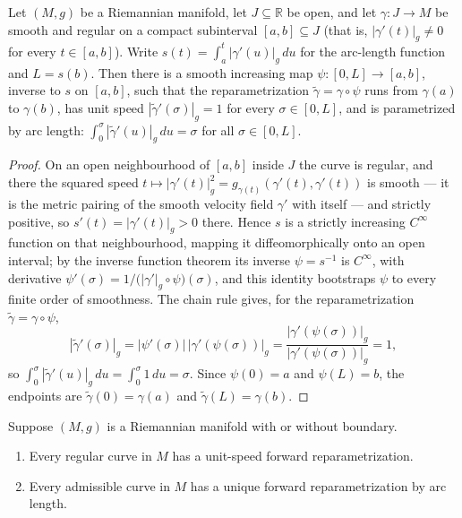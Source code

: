 \begin{proposition}
\label{prop:regular-curve-unit-speed-reparam}
\leanok
{}
Let $(M, g)$ be a Riemannian manifold, let $J \subseteq \mathbb{R}$ be open, and let $\gamma : J \to M$ be smooth and regular on a compact subinterval $[a,b] \subseteq J$ (that is, $|\gamma'(t)|_g \neq 0$ for every $t \in [a,b]$). Write $s(t) = \int_a^t |\gamma'(u)|_g \, du$ for the arc-length function and $L = s(b)$. Then there is a smooth increasing map $\psi : [0,L] \to [a,b]$, inverse to $s$ on $[a,b]$, such that the reparametrization $\tilde{\gamma} = \gamma \circ \psi$ runs from $\gamma(a)$ to $\gamma(b)$, has unit speed $|\tilde{\gamma}'(\sigma)|_g = 1$ for every $\sigma \in [0,L]$, and is parametrized by arc length: $\int_0^\sigma |\tilde{\gamma}'(u)|_g \, du = \sigma$ for all $\sigma \in [0,L]$.
\end{proposition}
\begin{proof}
\leanok
{}
On an open neighbourhood of $[a,b]$ inside $J$ the curve is regular, and there the squared speed $t \mapsto |\gamma'(t)|_g^2 = g_{\gamma(t)}(\gamma'(t), \gamma'(t))$ is smooth --- it is the metric pairing of the smooth velocity field $\gamma'$ with itself --- and strictly positive, so $s'(t) = |\gamma'(t)|_g > 0$ there. Hence $s$ is a strictly increasing $C^\infty$ function on that neighbourhood, mapping it diffeomorphically onto an open interval; by the inverse function theorem its inverse $\psi = s^{-1}$ is $C^\infty$, with derivative $\psi'(\sigma) = 1/\bigl(|\gamma'|_g \circ \psi\bigr)(\sigma)$, and this identity bootstraps $\psi$ to every finite order of smoothness. The chain rule gives, for the reparametrization $\tilde{\gamma} = \gamma \circ \psi$,
\[
|\tilde{\gamma}'(\sigma)|_g = |\psi'(\sigma)| \, |\gamma'(\psi(\sigma))|_g = \frac{|\gamma'(\psi(\sigma))|_g}{|\gamma'(\psi(\sigma))|_g} = 1,
\]
so $\int_0^\sigma |\tilde{\gamma}'(u)|_g \, du = \int_0^\sigma 1 \, du = \sigma$. Since $\psi(0) = a$ and $\psi(L) = b$, the endpoints are $\tilde{\gamma}(0) = \gamma(a)$ and $\tilde{\gamma}(L) = \gamma(b)$.
\end{proof}

\begin{proposition}
\label{prop:reparametrization-by-arc-length}
Suppose $(M, g)$ is a Riemannian manifold with or without boundary.
\begin{enumerate}
\item[(a)] Every regular curve in $M$ has a unit-speed forward reparametrization.
\item[(b)] Every admissible curve in $M$ has a unique forward reparametrization by arc length.
\end{enumerate}
\end{proposition}


